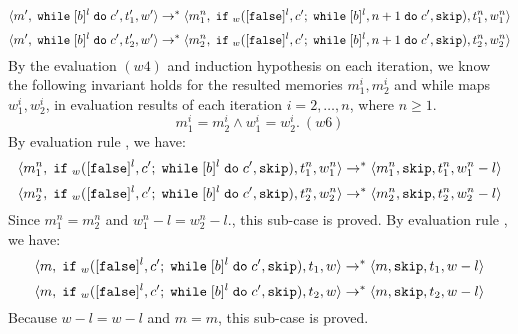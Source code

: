 {\begin{subproof}
%
\[
	\langle m', \;\mathtt{while}\; [b]^l \;\mathtt{do}\; c', t_1', w' \rangle \to^{*} \langle m_1^n, \;\mathtt{if}\;_w([\mathtt{false}]^l, c';\;\mathtt{while}\; [b]^l, n + 1 \;\mathtt{do}\; c', \mathtt{skip}), t_1^n, w_1^n \rangle
\]
%
\[
	\langle m', \;\mathtt{while}\; [b]^l \;\mathtt{do}\; c', t_2', w' \rangle \to^{*} \langle m_2^n, \;\mathtt{if}\;_w([\mathtt{false}]^l, c';\;\mathtt{while}\; [b]^l, n + 1 \;\mathtt{do}\; c', \mathtt{skip}), t_2^n, w_2^n \rangle
\]
%
By the evaluation $(w4)$ and induction hypothesis on each iteration, we know the following invariant holds for the resulted memories $m_1^i, m_2^i$ and while maps $w_1^i, w_2^i$,
in evaluation results of each iteration $i = 2, \ldots, n$, where $n \geq 1$. 
%
\[
m_1^i = m_2^i \land w_1^i = w_2^i. ~ (w6)
\]
%
%
By evaluation rule , we have:
%
\[
	\langle m_1^n, \;\mathtt{if}\;_w([\mathtt{false}]^l, c';\;\mathtt{while}\; [b]^l \;\mathtt{do}\; c', \mathtt{skip}), t_1^n, w_1^n \rangle 
	\to^{*} \langle m_1^n, \mathtt{skip}, t_1^n, w_1^n - l \rangle
\]
%
\[
	\langle m_2^n, \;\mathtt{if}\;_w([\mathtt{false}]^l, c';\;\mathtt{while}\; [b]^l \;\mathtt{do}\; c', \mathtt{skip}), t_2^n, w_2^n \rangle 
	\to^{*} \langle m_2^n, \mathtt{skip}, t_2^n, w_2^n - l \rangle
\]
%
Since $m_1^n = m_2^n$ and $w_1^n - l = w_2^n - l.$, this sub-case is proved.
%
%
By evaluation rule , we have:
%
\[
	\langle m, \;\mathtt{if}\;_w([\mathtt{false}]^l, c';\;\mathtt{while}\; [b]^l \;\mathtt{do}\; c', \mathtt{skip}), t_1, w \rangle 
	\to^{*} \langle m, \mathtt{skip}, t_1, w - l \rangle
\]
%
%
\[
	\langle m, \;\mathtt{if}\;_w([\mathtt{false}]^l, c';\;\mathtt{while}\; [b]^l \;\mathtt{do}\; c', \mathtt{skip}), t_2, w \rangle 
	\to^{*} \langle m, \mathtt{skip}, t_2, w - l \rangle
\]
%
Because $w - l = w - l$ and $m = m$, this sub-case is proved.
%
\end{subproof}
}